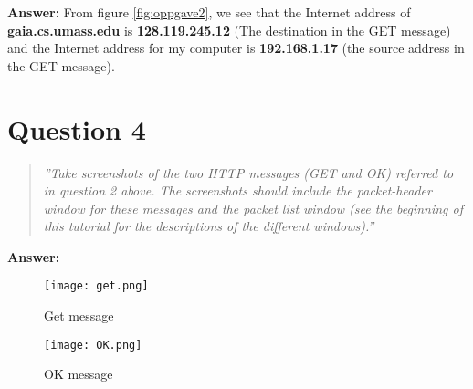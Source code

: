 \documentclass[12pt,a4paper]{article}
\begin{document}
		\textbf{Answer: } From figure \ref{fig:oppgave2}, we see that the Internet address of \textbf{gaia.cs.umass.edu} is \textbf{128.119.245.12} (The 							destination in the GET message) and the Internet address for my computer is \textbf{192.168.1.17} (the source address in the GET message).
			
	\section{Question 4}
		\begin{quote}
			\textit{
				''Take screenshots of the two HTTP messages (GET and OK) referred to in
				question 2 above. The screenshots should include the packet-header window for
				these messages and the packet list window (see the beginning of this tutorial for
				the descriptions of the different windows).''					
			}
		\end{quote}
		
		\textbf{Answer: } 
		\begin{figure}[hb!]
			\centering
			\texttt{[image: get.png]}
			\caption{Get message}
			\label{fig:get_message}
		\end{figure}
		
		\begin{figure}[hb!]
			\centering
			\texttt{[image: OK.png]}
			\caption{OK message}
			\label{fig:OK_message}
		\end{figure}
\end{document}
